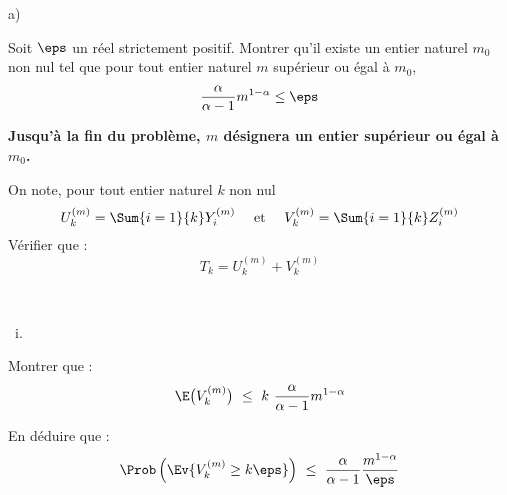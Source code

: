 \begin{liste}{a)}
  \setcounter{enumi}{3}
\item Soit $\eps$ un réel strictement positif. Montrer qu'il existe
  un entier naturel $m_{0}$ non nul tel que pour tout entier naturel
  $m$ supérieur ou égal à $m_{0}$,
  \[
  \dfrac{\alpha}{\alpha-1} m^{1-\alpha} \leq \eps
  \]
  
  
  
  
  
  
  \noindent
  \textbf{Jusqu'à la fin du problème, $m$ désignera un entier
    supérieur ou égal à $m_{0}$.}
  
\item On note, pour tout entier naturel $k$ non nul
  \[
  U_{k}^{(m)} = \Sum{i = 1}{k} Y_{i}^{(m)} \quad \text{ et } \quad
  V_{k}^{(m)} = \Sum{i = 1}{k} Z_{i}^{(m)}
  \]
  Vérifier que :
  \[
  T_{k} = U_{k}^{(m)} + V_{k}^{(m)}
  \]
  
  
  
  
\item ~\\[-1.15cm]
\end{liste}
\begin{liste}{\ i.}
\item Montrer que :
  \[
  \E\big(V_{k}^{(m)} \big) \ \leq \ k \ \dfrac{\alpha}{\alpha-1}
  m^{1-\alpha}
  \]
  
  
  
\item En déduire que :
  \[
  \Prob\left(\Ev{V_{k}^{(m)} \geq k \eps} \right) \ \leq \ 
  \dfrac{\alpha}{\alpha-1} \dfrac{m^{1-\alpha}}{\eps}
  \]

  
\end{liste}

